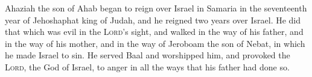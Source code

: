  Ahaziah the son of Ahab began to reign over Israel in
Samaria in the seventeenth year of Jehoshaphat king of Judah, and he
reigned two years over Israel.  He did that which was
evil in the \textsc{Lord}'s sight, and walked in the way of his father,
and in the way of his mother, and in the way of Jeroboam the son of
Nebat, in which he made Israel to sin.  He served Baal
and worshipped him, and provoked the \textsc{Lord}, the God of Israel,
to anger in all the ways that his father had done so.
